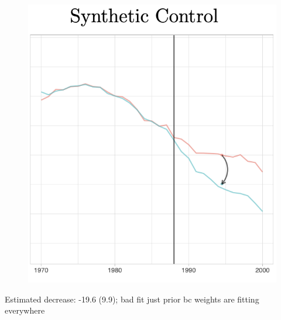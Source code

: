\documentclass{beamer}
\begin{document}
\begin{frame}[plain]

	\begin{figure}
	\includegraphics[scale=0.65]{./lecture_includes/sdid_1.png}
	\end{figure}

Estimated decrease: -19.6 (9.9); bad fit just prior bc weights are fitting everywhere

\end{frame}
\end{document}
